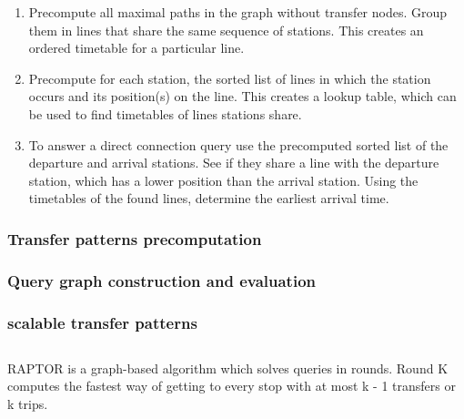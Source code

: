 \begin{enumerate}
    \item Precompute all maximal paths in the graph without transfer nodes. Group them in lines that share the same sequence of stations. This creates an ordered timetable for a particular line.
    \item Precompute for each station,  the sorted list of lines in which the station occurs and its position(s) on the line. This creates a lookup table, which can be used to find timetables of lines stations share.
    \item To answer a direct connection query use the precomputed sorted list of the departure and arrival stations. See if they share a line with the departure station, which has a lower position than the arrival station. Using the timetables of the found lines, determine the earliest arrival time.
\end{enumerate}
\subsubsection{Transfer patterns precomputation}
\subsubsection{Query graph construction and evaluation}
\subsubsection{scalable transfer patterns}
\subsection{}
\subsection{}
RAPTOR is a graph-based algorithm which solves queries in rounds. Round K computes the fastest way of getting to every stop with at most k - 1 transfers or k trips.

